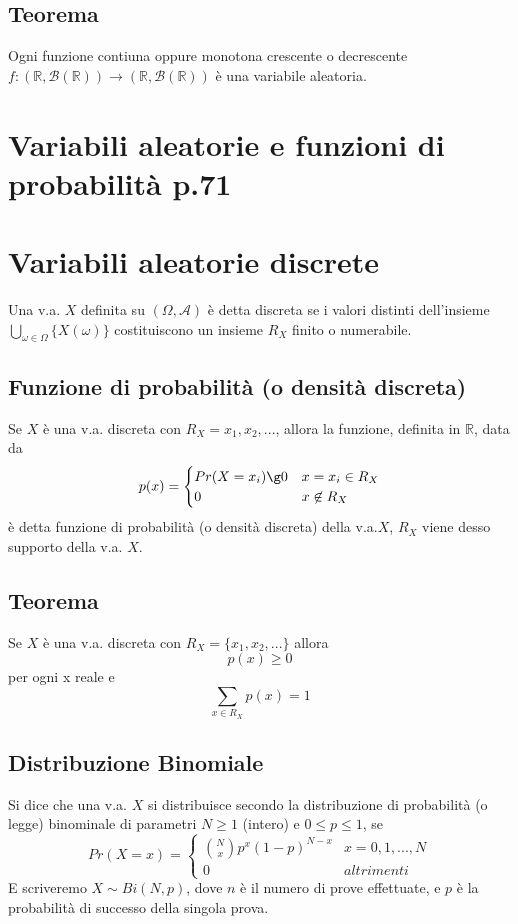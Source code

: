 \documentclass[a4paper]{report}
\begin{document}
  \subsection{Teorema}
  Ogni funzione contiuna oppure monotona crescente o decrescente $f:(\mathbb{R},\mathcal{B}(\mathbb{R})) \rightarrow (\mathbb{R},\mathcal{B}(\mathbb{R})) $ è una variabile aleatoria.

  \section{Variabili aleatorie e funzioni di probabilità p.71}
  \section{Variabili aleatorie discrete}
  Una v.a. $X$ definita su $(\Omega, \mathcal{A})$ è detta discreta se i valori distinti dell'insieme $\bigcup_{\omega \in \Omega} \{ {X(\omega)} \}$ costituiscono un insieme $R_X$ finito o numerabile.

  \subsection{Funzione di probabilità (o densità discreta)}
  Se $X$ è una v.a. discreta con $R_X = {x_1,x_2,...}$, allora la funzione, definita in $\mathbb{R}$, data da
  \[
    p(x) =
      \begin{cases}
         Pr(X = x_i) \g 0 & x = x_i \in R_X \\
         0  & x \not\in R_X
      \end{cases}
  \]
  è detta funzione di probabilità (o densità discreta) della v.a.$X$, $R_X$ viene desso supporto della v.a. $X$.

  \subsection{Teorema}
  Se $X$ è una v.a. discreta con $R_X = \{ x_1,x_2,... \}$ allora
  \[ p(x) \geq 0 \] per ogni x reale e \[ \sum_{x\in R_X} p(x) = 1 \]

  \subsection{Distribuzione Binomiale}
  Si dice che una v.a. $X$ si distribuisce secondo la distribuzione di probabilità (o legge) binominale di parametri $N \geq 1$ (intero) e $0 \leq p \leq 1$, se
  \[
    Pr(X = x) =
      \begin{cases}
          \binom{N}{x}p^x(1-p)^{N-x} & x = 0, 1, ..., N \\
          0 & altrimenti
      \end{cases}
  \]
   E scriveremo $ X \sim Bi(N,p) $, dove $n$ è il numero di prove effettuate, e $p$ è la probabilità di successo della singola prova.
\end{document}
